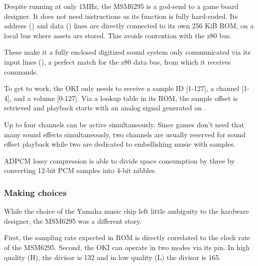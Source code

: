 Despite running at only 1MHz, the MSM6295 is a god-send to a game board designer. It does not need instructions as its function is fully hard-coded. Its address () and data () lines are directly connected to its own 256 KiB ROM, on a local bus where assets are stored. This avoids contention with the z80 bus. 

These make it a fully enclosed digitized sound system only communicated via its input lines (), a perfect match for the z80 data bus, from which it receives commands.

To get to work, the OKI only needs to receive a sample ID [1-127], a channel [1-4], and a volume [0-127]. Via a lookup table in its ROM, the sample offset is retrieved and playback starts with an analog signal generated on . 


Up to four channels can be active simultaneously. Since games don't need that many sound effects simultaneously, two channels are usually reserved for sound effect playback while two are dedicated to embellishing music with samples.

ADPCM lossy compression is able to divide space consumption by three by converting 12-bit PCM samples into 4-bit nibbles. 


\subsubsection{Making choices}
While the choice of the Yamaha music chip left little ambiguity to the hardware designer, the MSM6295 was a different story.

First, the sampling rate expected in ROM is directly correlated to the clock rate of the MSM6295. Second, the OKI can operate in two modes via its  pin. In high quality (H), the divisor is 132 and in low quality (L) the divisor is 165.

